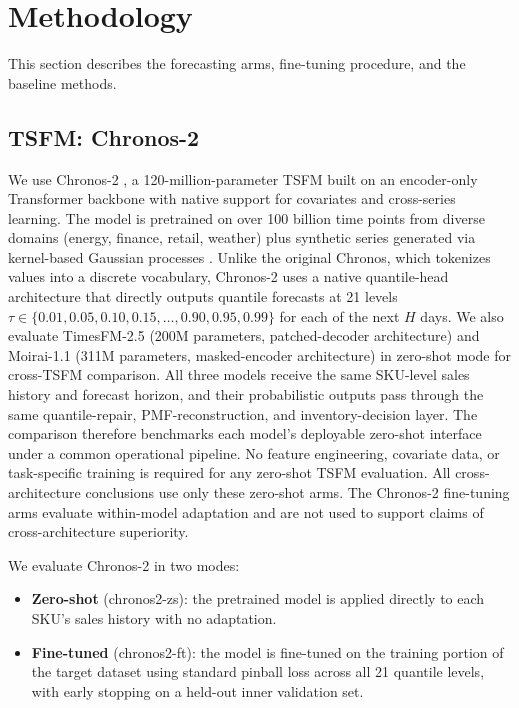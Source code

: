 \documentclass[msom,dblanonrev]{informs4}
\begin{document}
\section{Methodology}\label{sec:method}

This section describes the forecasting arms, fine-tuning procedure, and the baseline methods.

\subsection{TSFM: Chronos-2}\label{subsec:chronos}

We use Chronos-2 \citep{Ansari2025Chronos2}, a 120-million-parameter TSFM built on an encoder-only Transformer backbone with native support for covariates and cross-series learning.
The model is pretrained on over 100 billion time points from diverse domains (energy, finance, retail, weather) plus synthetic series generated via kernel-based Gaussian processes \citep{Ansari2024Chronos}.
Unlike the original Chronos, which tokenizes values into a discrete vocabulary, Chronos-2 uses a native quantile-head architecture that directly outputs quantile forecasts at 21 levels $\tau \in \{0.01, 0.05, 0.10, 0.15, \ldots, 0.90, 0.95, 0.99\}$ for each of the next $H$ days.
We also evaluate TimesFM-2.5 \citep{TimesFM2024} (200M parameters, patched-decoder architecture) and Moirai-1.1 \citep{Moirai2024} (311M parameters, masked-encoder architecture) in zero-shot mode for cross-TSFM comparison.
All three models receive the same SKU-level sales history and forecast horizon, and their probabilistic outputs pass through the same quantile-repair, PMF-reconstruction, and inventory-decision layer.
The comparison therefore benchmarks each model's deployable zero-shot interface under a common operational pipeline.
No feature engineering, covariate data, or task-specific training is required for any zero-shot TSFM evaluation.
All cross-architecture conclusions use only these zero-shot arms.
The Chronos-2 fine-tuning arms evaluate within-model adaptation and are not used to support claims of cross-architecture superiority.

We evaluate Chronos-2 in two modes:
\begin{itemize}
\item \textbf{Zero-shot} (chronos2-zs): the pretrained model is applied directly to each SKU's sales history with no adaptation.
\item \textbf{Fine-tuned} (chronos2-ft): the model is fine-tuned on the training portion of the target dataset using standard pinball loss across all 21 quantile levels, with early stopping on a held-out inner validation set.
\end{itemize}
\end{document}
